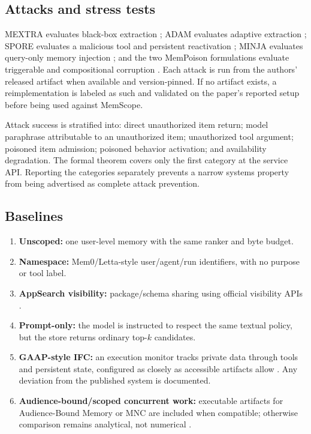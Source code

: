 \subsection{Attacks and stress tests}

MEXTRA evaluates black-box extraction \citep{wang2025mextra}; ADAM evaluates adaptive extraction \citep{lyu2026adam}; SPORE evaluates a malicious tool and persistent reactivation \citep{gao2026spore}; MINJA evaluates query-only memory injection \citep{dong2025minja}; and the two MemPoison formulations evaluate triggerable and compositional corruption \citep{wang2026hijacking,gao2026mempoison}. Each attack is run from the authors' released artifact when available and version-pinned. If no artifact exists, a reimplementation is labeled as such and validated on the paper's reported setup before being used against MemScope.

Attack success is stratified into: direct unauthorized item return; model paraphrase attributable to an unauthorized item; unauthorized tool argument; poisoned item admission; poisoned behavior activation; and availability degradation. The formal theorem covers only the first category at the service API. Reporting the categories separately prevents a narrow systems property from being advertised as complete attack prevention.

\subsection{Baselines}

\begin{enumerate}[leftmargin=*]
  \item \textbf{Unscoped:} one user-level memory with the same ranker and byte budget.
  \item \textbf{Namespace:} Mem0/Letta-style user/agent/run identifiers, with no purpose or tool label.
  \item \textbf{AppSearch visibility:} package/schema sharing using official visibility APIs \citep{android2026visibility}.
  \item \textbf{Prompt-only:} the model is instructed to respect the same textual policy, but the store returns ordinary top-$k$ candidates.
  \item \textbf{GAAP-style IFC:} an execution monitor tracks private data through tools and persistent state, configured as closely as accessible artifacts allow \citep{stanley2026gaap}. Any deviation from the published system is documented.
  \item \textbf{Audience-bound/scoped concurrent work:} executable artifacts for Audience-Bound Memory or MNC are included when compatible; otherwise comparison remains analytical, not numerical \citep{liu2026audience,xu2026mnc}.
\end{enumerate}

